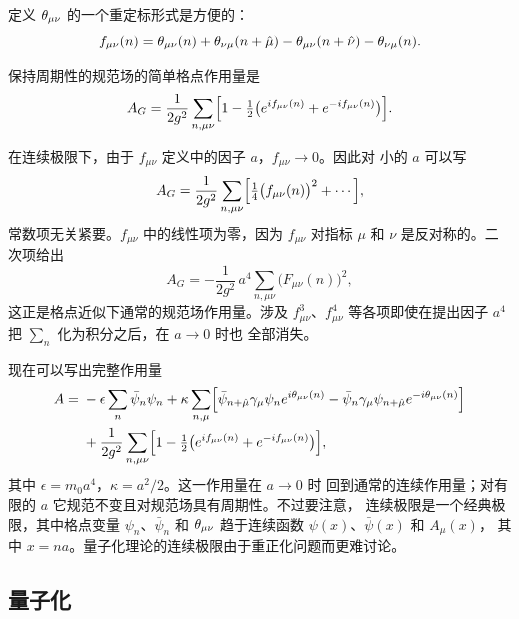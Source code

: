 定义 $\theta_{\mu\nu}$ 的一个重定标形式是方便的：
\begin{equation}
f_{\mu\nu}(n) = \theta_{\mu\nu}(n)+\theta_{\nu\mu}(n+\hat\mu)
-\theta_{\mu\nu}(n+\hat\nu)-\theta_{\nu\mu}(n).
\label{eq:3.8}
\end{equation}

保持周期性的规范场的简单格点作用量是
\begin{equation}
A_{G} = \frac{1}{2g^{2}}\sum_{n,\mu\nu}
        \Bigl[1-\tfrac{1}{2}\bigl(e^{if_{\mu\nu}(n)}+e^{-if_{\mu\nu}(n)}\bigr)\Bigr].
\label{eq:3.9}
\end{equation}

在连续极限下，由于 $f_{\mu\nu}$ 定义中的因子 $a$，$f_{\mu\nu} \to 0$。因此对
小的 $a$ 可以写
\[
A_{G} = \frac{1}{2g^{2}}\sum_{n,\mu\nu}
        \Bigl[\tfrac{1}{4}\bigl(f_{\mu\nu}(n)\bigr)^{2}+\cdots\Bigr],
\]
常数项无关紧要。$f_{\mu\nu}$ 中的线性项为零，因为 $f_{\mu\nu}$ 对指标 $\mu$
和 $\nu$ 是反对称的。二次项给出
\begin{equation}
A_{G} = -\frac{1}{2g^{2}}\,a^{4}\sum_{n,\mu\nu}\bigl(F_{\mu\nu}(n)\bigr)^{2},
\label{eq:3.11}
\end{equation}
这正是格点近似下通常的规范场作用量。涉及 $f_{\mu\nu}^{3}$、$f_{\mu\nu}^{4}$
等各项即使在提出因子 $a^{4}$ 把 $\sum_{n}$ 化为积分之后，在 $a\to0$ 时也
全部消失。

现在可以写出完整作用量
\begin{equation}
\begin{split}
A = {} & -\epsilon\sum_{n}\bar\psi_{n}\psi_{n}
         + \kappa\sum_{n,\mu}\Bigl[
           \bar\psi_{n+\hat\mu}\gamma_{\mu}\psi_{n}e^{i\theta_{\mu\nu}(n)}
           -\bar\psi_{n}\gamma_{\mu}\psi_{n+\hat\mu}e^{-i\theta_{\mu\nu}(n)}\Bigr]\\
       & + \frac{1}{2g^{2}}\sum_{n,\mu\nu}
         \Bigl[1-\tfrac{1}{2}\bigl(e^{if_{\mu\nu}(n)}+e^{-if_{\mu\nu}(n)}\bigr)\Bigr],
\end{split}
\label{eq:3.12}
\end{equation}
其中 $\epsilon = m_{0}a^{4}$，$\kappa = a^{2}/2$。这一作用量在 $a \to 0$ 时
回到通常的连续作用量；对有限的 $a$ 它规范不变且对规范场具有周期性。不过要注意，
连续极限是一个经典极限，其中格点变量 $\psi_{n}$、$\bar\psi_{n}$ 和
$\theta_{\mu\nu}$ 趋于连续函数 $\psi(x)$、$\bar\psi(x)$ 和 $A_{\mu}(x)$，
其中 $x=na$。量子化理论的连续极限由于重正化问题而更难讨论。

\subsection{量子化}\label{sec:quantization}

